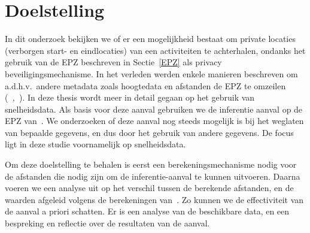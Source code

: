 \section{Doelstelling}
In dit onderzoek bekijken we of er een mogelijkheid bestaat om private locaties
(verborgen start- en eindlocaties) van een activiteiten te achterhalen, ondanks
het gebruik van de \ac{EPZ} beschreven in Sectie~\ref{EPZ} als privacy
beveiligingsmechanisme. In het verleden werden enkele manieren beschreven om
a.d.h.v.\ andere metadata zoals hoogtedata en afstanden de \ac{EPZ} te omzeilen
(\textit{~\cite{Dhondt_Pochat_Voulimeneas_Joosen_Volckaert_2022},~\cite{Verdonck_2022}}).
In deze thesis wordt meer in detail gegaan op het gebruik van snelheidsdata.
Als basis voor deze aanval gebruiken we de inferentie aanval op de EPZ
van~\citeauthor{Dhondt_Pochat_Voulimeneas_Joosen_Volckaert_2022}. We
onderzoeken of deze aanval nog steeds mogelijk is bij het weglaten van bepaalde
gegevens, en dus door het gebruik van andere gegevens. De focus ligt in deze
studie voornamelijk op snelheidsdata.

Om deze doelstelling te behalen is eerst een berekeningsmechanisme nodig voor
de afstanden die nodig zijn om de inferentie-aanval te kunnen uitvoeren. Daarna
voeren we een analyse uit op het verschil tussen de berekende afstanden, en de
waarden afgeleid volgens de berekeningen
van~\citeauthor{Dhondt_Pochat_Voulimeneas_Joosen_Volckaert_2022}. Zo kunnen we
de effectiviteit van de aanval a priori schatten. Er is een analyse van de
beschikbare data, en een bespreking en reflectie over de resultaten van de
aanval.
